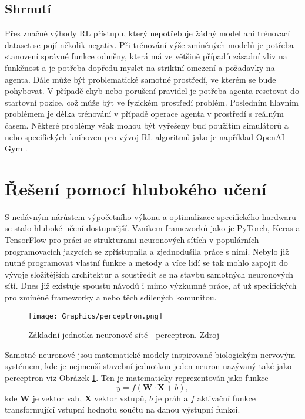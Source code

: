 \documentclass[czech, bc, kky, he, iso690numb]{fasthesis}
\begin{document}
        	\subsection{Shrnutí}
        		Přes značné výhody RL přístupu, který nepotřebuje žádný model ani trénovací dataset se pojí několik negativ. Při trénování výše zmíněných modelů je potřeba stanovení správné funkce odměny, která má ve většině případů zásadní vliv na funkčnost a je potřeba dopředu myslet na striktní omezení a požadavky na agenta. Dále může být problematické samotné prostředí, ve kterém se bude pohybovat. V případě chyb nebo porušení pravidel je potřeba agenta resetovat do startovní pozice, což může být ve fyzickém prostředí problém. Posledním hlavním problémem je délka trénování v případě operace agenta v prostředí s reálným časem. Některé problémy však mohou být vyřešeny buď použitím simulátorů a nebo specifických knihoven pro vývoj RL algoritmů jako je například OpenAI Gym \cite{openai_gym}.
            
        \section{Řešení pomocí hlubokého učení}\label{sec:reseni_deep_learning}
        	S nedávným nárůstem výpočetního výkonu a optimalizace specifického hardwaru se stalo hluboké učení dostupnější. Vznikem frameworků jako je PyTorch, Keras a TensorFlow pro práci se strukturami neuronových sítích v populárních programovacích jazycích se zpřístupnila a zjednodušila práce s nimi. Nebylo již nutné programovat vlastní funkce a metody a více lidí se tak mohlo zapojit do vývoje složitějších architektur a soustředit se na stavbu samotných neuronových sítí. Dnes již existuje spoustu návodů i mimo výzkumné práce, ať už specifických pro zmíněné frameworky a nebo těch sdílených komunitou.
            
	            \begin{figure}[h]
	            	\centering
	            	\texttt{[image: Graphics/perceptron.png]}
	            	\caption{Základní jednotka neuronové sítě - perceptron. Zdroj \cite{neural_networks_background_02}}
	            	\label{pic:perceptron}
	            \end{figure}
	            
            Samotné neuronové jsou matematické modely inspirované biologickým nervovým systémem, kde je nejmenší stavební jednotkou jeden neuron nazývaný také jako perceptron viz Obrázek \ref{pic:perceptron}. Ten je matematicky reprezentován jako funkce 
            \[y=f(\mathbf{W}\cdot\mathbf{X} + b),\]
            kde \(\mathbf{W}\) je vektor vah, \(\mathbf{X}\) vektor vstupů, \(b\) je práh a \(f\) aktivační funkce transformující vstupní hodnotu součtu na danou výstupní funkci.
            
\end{document}
